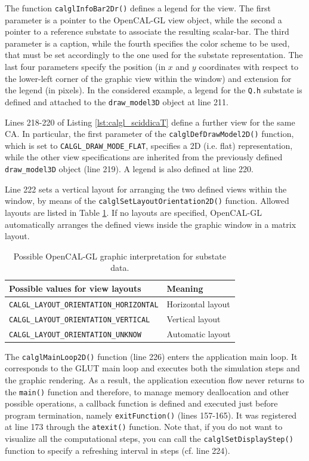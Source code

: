 The function \verb'calglInfoBar2Dr()' defines a legend for the
view. The first parameter is a pointer to the OpenCAL-GL view object,
while the second a pointer to a reference substate to associate the
resulting scalar-bar. The third parameter is a caption, while the
fourth specifies the color scheme to be used, that must be set
accordingly to the one used for the substate representation. The last
four parameters specify the position (in $x$ and $y$ coordinates with
respect to the lower-left corner of the graphic view within the
window) and extension for the legend (in pixels). In the considered
example, a legend for the \verb'Q.h' substate is defined and attached
to the \verb'draw_model3D' object at line 211.

Lines 218-220 of Listing \ref{lst:calgl_sciddicaT} define a further
view for the same CA. In particular, the first parameter of the
\verb'calglDefDrawModel2D()' function, which is set to
\verb'CALGL_DRAW_MODE_FLAT', specifies a 2D (i.e. flat)
representation, while the other view specifications are inherited from
the previously defined \verb'draw_model3D' object (line 219). A legend
is also defined at line 220.

Line 222 sets a vertical layout for arranging the two defined views
within the window, by means of the
\verb'calglSetLayoutOrientation2D()' function. Allowed layouts are
listed in Table \ref{tab:calgl_layouts}. If no layouts are specified,
OpenCAL-GL automatically arranges the defined views inside the graphic
window in a matrix layout.

\begin{table}
  \centering
  \small
  \begin{tabular}{l|l}
    \hline
    Possible values for view layouts & Meaning\\
    \hline
    \verb'CALGL_LAYOUT_ORIENTATION_HORIZONTAL' & Horizontal layout\\
    \verb'CALGL_LAYOUT_ORIENTATION_VERTICAL'   & Vertical layout\\
    \verb'CALGL_LAYOUT_ORIENTATION_UNKNOW'     & Automatic layout\\
    \hline
  \end{tabular}
  \caption{Possible OpenCAL-GL graphic interpretation for substate data.}
  \label{tab:calgl_layouts}
\end{table}

The \verb'calglMainLoop2D()' function (line 226) enters the
application main loop. It corresponds to the GLUT main loop and
executes both the simulation steps and the graphic rendering. As a
result, the application execution flow never returns to the
\verb'main()' function and therefore, to manage memory deallocation
and other possible operations, a callback function is defined and
executed just before program termination, namely \verb'exitFunction()'
(lines 157-165). It was registered at line 173 through the
\verb'atexit()' function. Note that, if you do not want to visualize all
the computational steps, you can call the \verb'calglSetDisplayStep()'
function to specify a refreshing interval in steps (cf. line 224).

